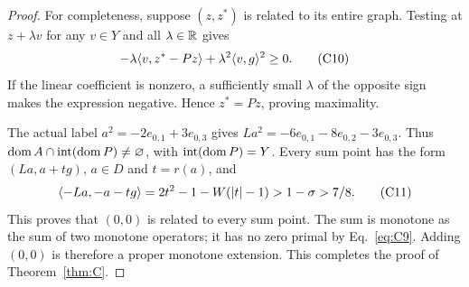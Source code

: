 \begin{proof}
For completeness, suppose $(z,z^*)$ is related to its entire graph.
Testing at $z+\lambda v$ for any $v\in Y$ and all $\lambda\in\mathbb R$ gives
\begin{equation}
-\lambda\langle v,z^*-Pz\rangle+\lambda^2\langle v,g\rangle^2\ge0.
\tag{C10}\label{eq:C10}
\end{equation}
If the linear coefficient is nonzero, a sufficiently small $\lambda$ of
the opposite sign makes the expression negative. Hence $z^*=Pz$, proving maximality.

The actual label $a^2=-2e_{0,1}+3e_{0,3}$ gives
$La^2=-6e_{0,1}-8e_{0,2}-3e_{0,3}$. Thus
$\operatorname{dom} A\cap\operatorname{int}(\operatorname{dom} P)\ne\varnothing$, with
$\operatorname{int}(\operatorname{dom} P)=Y$. Every sum point has the form
$(La,a+tg)$, $a\in D$ and $t=r(a)$, and
\begin{equation}
\langle -La,-a-tg\rangle=2t^2-1-W(|t|-1)>1-\sigma>7/8.
\tag{C11}\label{eq:C11}
\end{equation}
This proves that $(0,0)$ is related to every sum point. The sum is
monotone as the sum of two monotone operators; it has no zero primal by
Eq.~\eqref{eq:C9}. Adding $(0,0)$ is therefore a proper monotone extension.
This completes the proof of Theorem~\ref{thm:C}.
\end{proof}


